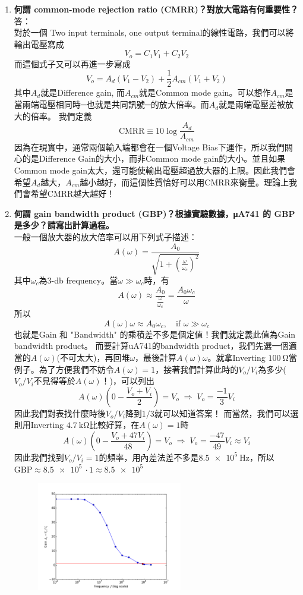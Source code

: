 \documentclass[12pt, a4paper]{article}
\def\large{\fontsize{14}{21}\selectfont}
\begin{document}
\begin{enumerate}[itemsep=20pt, topsep=10pt]
  \item {\large\bf 何謂 common-mode rejection ratio (CMRR)？對放大電路有何重要性？} \\[10pt]
    答：\\
    對於一個 Two input terminals, one output terminal的線性電路，我們可以將輸出電壓寫成
    \[ V_o = C_1 V_1 + C_2 V_2 \]
    而這個式子又可以再進一步寫成
    \[ V_o = A_d (V_1 - V_2) + \frac{1}{2} A_{cm} (V_1 + V_2) \]
    其中$A_d$就是Difference gain, 而$A_{cm}$就是Common mode gain。可以想作$A_{cm}$是當兩端電壓相同時─也就是共同訊號─的放大倍率。而$A_d$就是兩端電壓差被放大的倍率。
  我們定義 \[ \text{CMRR} \equiv 10 \log \frac{A_{d}}{A_{cm}} \]
  因為在現實中，通常兩個輸入端都會在一個Voltage Bias下運作，所以我們關心的是Difference Gain的大小，而非Common mode gain的大小。並且如果Common mode gain太大，還可能使輸出電壓超過放大器的上限。因此我們會希望$A_d$越大，$A_{cm}$越小越好，而這個性質恰好可以用CMRR來衡量。理論上我們會希望CMRR越大越好！

\item {\large\bf 何謂 gain bandwidth product (GBP)？根據實驗數據，μA741 的 GBP 是多少？請寫出計算過程。} \\[10pt]
  一般一個放大器的放大倍率可以用下列式子描述：
  \[ A(\omega) = \frac{A_0}{\sqrt{1 + \left( \frac{\omega}{\omega_c} \right)^2 }} \]
  其中$\omega_c$為3-db frequency。當$\omega \gg \omega_c$時，有
  \[
  A(\omega) \approx \frac{A_0}{\frac{\omega}{\omega_c}} = \frac{A_0 \omega_c}{\omega} \]
  所以
  \[
  A(\omega) \omega \approx A_0 \omega_c, \quad \text{if } \omega \gg \omega_c \]
  也就是Gain 和 "Bandwidth" 的乘積差不多是個定值！我們就定義此值為Gain bandwidth product。
  而要計算uA741的bandwidth product，我們先選一個適當的$A(\omega)$(不可太大)，再回堆$\omega$，最後計算$A(\omega) \omega$。就拿Inverting $\SI{100}\ohm$當例子。為了方便我們不妨令$A(\omega) = 1$，接著我們計算此時的$V_o / V_i$為多少($V_o / V_i$不見得等於$A(\omega)$！)，可以列出
  \[
    A(\omega) \left(0 - \frac{V_o + V_i}{2}\right) = V_o \; \Rightarrow \; V_o = \frac{-1}{3} V_i
  \]
  因此我們對表找什麼時後$V_o / V_i$降到$1/3$就可以知道答案！
  而當然，我們可以選則用Inverting $\SI{4.7}\kohm$比較好算，在$A(\omega) = 1$時
  \[
    A(\omega) \left(0 - \frac{V_o + 47 V_i}{48}\right) = V_o \; \Rightarrow \; V_o = \frac{-47}{49} V_i \approx V_i
  \]
  因此我們找到$V_o / V_i = 1$的頻率，用內差法差不多是$\SI{8.5e5}\Hz$，所以$\text{GBP} \approx \SI{8.5e5}{} \cdot 1 \approx \SI{8.5e5}{}$
  \begin{figure}[H]
    \centering
    \includegraphics[width=0.6\textwidth]{img/r1.pdf}
  \end{figure}


\end{enumerate}
\end{document}
